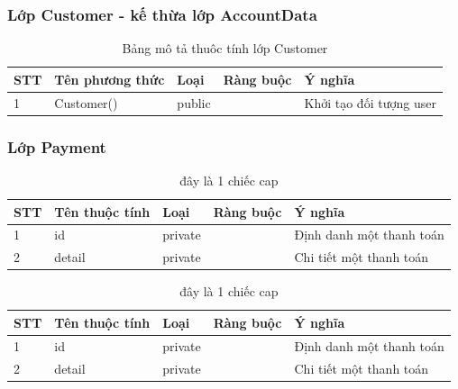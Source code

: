 \documentclass[a4paper, 12pt]{article}
\begin{document}
\subsubsection{Lớp Customer - kế thừa lớp AccountData}

\begin{table}[H]
	\begin{center}
		\begin{tabular}{|l|l|l|l|l|}
			\hline
			STT & Tên phương thức          & Loại   & Ràng buộc & Ý nghĩa                                                                           \\ \hline
			1   & Customer() 				   & public &           & Khởi tạo đối tượng user \\ \hline
		\end{tabular}
		\caption{Bảng mô tả thuôc tính lớp Customer}
	\end{center}
\end{table}

\subsubsection{Lớp Payment}

\begin{table}[H]
	\begin{center}
		\begin{tabular}{|l|l|l|l|l|}
		\hline
		STT & Tên thuộc tính & Loại    & Ràng buộc & Ý nghĩa                  \\ \hline
		1   & id             & private &           & Định danh một thanh toán \\ \hline
		2   & detail         & private &           & Chi tiết một thanh toán  \\ \hline
		\end{tabular}
		\caption{đây là 1 chiếc cap}
	\end{center}
\end{table}

\begin{table}[H]
	\begin{center}
		\begin{tabular}{|l|l|l|l|l|}
		\hline
		STT & Tên thuộc tính & Loại    & Ràng buộc & Ý nghĩa                  \\ \hline
		1   & id             & private &           & Định danh một thanh toán \\ \hline
		2   & detail         & private &           & Chi tiết một thanh toán  \\ \hline
		\end{tabular}
		\caption{đây là 1 chiếc cap}
	\end{center}
\end{table}
\end{document}
